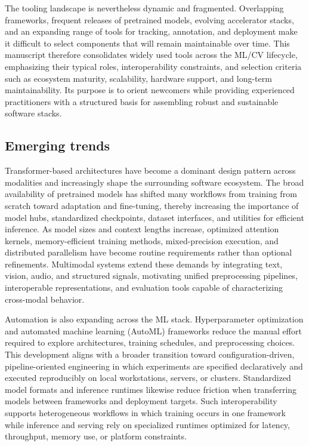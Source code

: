 \documentclass{article}
\begin{document}
The tooling landscape is nevertheless dynamic and fragmented. Overlapping frameworks, frequent releases of pretrained models, evolving accelerator stacks, and an expanding range of tools for tracking, annotation, and deployment make it difficult to select components that will remain maintainable over time. This manuscript therefore consolidates widely used tools across the ML/CV lifecycle, emphasizing their typical roles, interoperability constraints, and selection criteria such as ecosystem maturity, scalability, hardware support, and long-term maintainability. Its purpose is to orient newcomers while providing experienced practitioners with a structured basis for assembling robust and sustainable software stacks.


\subsection{Emerging trends}

Transformer-based architectures have become a dominant design pattern across modalities and increasingly shape the surrounding software ecosystem. The broad availability of pretrained models has shifted many workflows from training from scratch toward adaptation and fine-tuning, thereby increasing the importance of model hubs, standardized checkpoints, dataset interfaces, and utilities for efficient inference. As model sizes and context lengths increase, optimized attention kernels, memory-efficient training methods, mixed-precision execution, and distributed parallelism have become routine requirements rather than optional refinements. Multimodal systems extend these demands by integrating text, vision, audio, and structured signals, motivating unified preprocessing pipelines, interoperable representations, and evaluation tools capable of characterizing cross-modal behavior.

Automation is also expanding across the ML stack. Hyperparameter optimization and automated machine learning (AutoML) frameworks reduce the manual effort required to explore architectures, training schedules, and preprocessing choices. This development aligns with a broader transition toward configuration-driven, pipeline-oriented engineering in which experiments are specified declaratively and executed reproducibly on local workstations, servers, or clusters. Standardized model formats and inference runtimes likewise reduce friction when transferring models between frameworks and deployment targets. Such interoperability supports heterogeneous workflows in which training occurs in one framework while inference and serving rely on specialized runtimes optimized for latency, throughput, memory use, or platform constraints.
\end{document}
